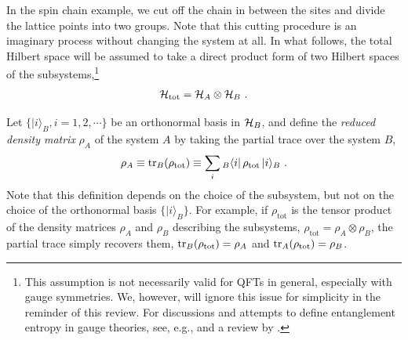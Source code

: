 In the spin chain example,
we cut off the chain in between the sites and divide the lattice points into two groups. 
Note that this cutting procedure is an imaginary process without changing the system at all.
In what follows, the total Hilbert space will be assumed to take a direct product form of two Hilbert spaces of the subsystems,\footnote{This assumption is not necessarily valid for QFTs in general, especially with gauge symmetries.
We, however, will ignore this issue for simplicity in the reminder of this review.
For discussions and attempts to define entanglement entropy in gauge theories, see, e.g., \textcite{Casini:2013rba,Radicevic:2014kqa,Donnelly:2014gva,Donnelly:2014fua,Huang:2014pfa,Ghosh:2015iwa,Hung:2015fla,Aoki:2015bsa,Chen:2015kfa,Donnelly:2015hxa,Radicevic:2015sza,Pretko:2015zva,Soni:2015yga,Ma:2015xes,VanAcoleyen:2015ccp} and a review by \textcite{Pretko:2018yxl}.
}
\begin{align}
	{\cal H}_\text{tot} = {\cal H}_{A}\otimes {\cal H}_{B} \ .
\end{align}

Let $\{ |i\rangle_B, i=1,2,\cdots\}$ be an orthonormal basis in ${\cal H}_B$, and define
the {\it reduced density matrix} $\rho_A$ of the system $A$ by taking the partial trace over the system $B$,
\begin{align}\label{ReducedDM}
\rho_A \equiv {\rm tr}_{B}( \rho_\text{tot} ) \equiv \sum_{i} {}_B\langle i |\, \rho_\text{tot} \,| i\rangle_B \ .
\end{align}
Note that this definition depends on the choice of the subsystem, but not on the choice of the orthonormal basis $\{ |i\rangle_B\}$.
For example, if $\rho_\text{tot}$ is the tensor product of the density matrices $\rho_A$ and $\rho_B$ describing the subsystems, $\rho_\text{tot} = \rho_A \otimes \rho_B$, the partial trace simply recovers them, ${\rm tr}_B(\rho_\text{tot}) = \rho_A$ and ${\rm tr}_A(\rho_\text{tot}) = \rho_B$.

